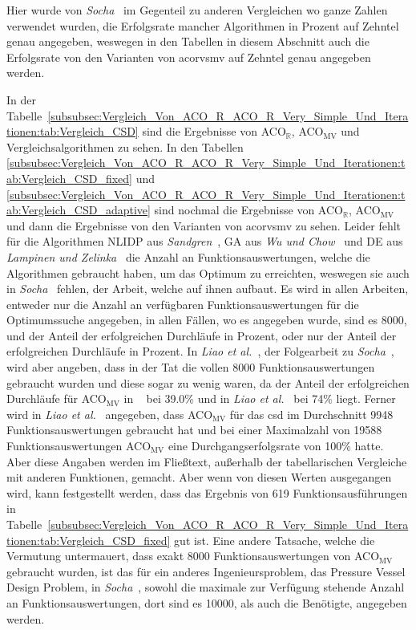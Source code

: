 \documentclass[fontsize=12, a4aper]{scrartcl}
\begin{document}
	Hier wurde von \textit{Socha}~\cite{socha2009ant} im Gegenteil zu anderen Vergleichen wo ganze Zahlen verwendet wurden, die Erfolgsrate mancher Algorithmen in Prozent auf Zehntel genau angegeben, weswegen in den Tabellen in diesem Abschnitt auch die Erfolgsrate von den Varianten von \ac{acorvsmv} auf Zehntel genau angegeben werden.\hfill\newline
	
	In der Tabelle~\ref{subsubsec:Vergleich_Von_ACO_R_ACO_R_Very_Simple_Und_Iterationen:tab:Vergleich_CSD} sind die Ergebnisse von ACO\(_\mathbb{R}\), ACO\(_\text{MV}\) und Vergleichsalgorithmen zu sehen. In den Tabellen \ref{subsubsec:Vergleich_Von_ACO_R_ACO_R_Very_Simple_Und_Iterationen:tab:Vergleich_CSD_fixed} und \ref{subsubsec:Vergleich_Von_ACO_R_ACO_R_Very_Simple_Und_Iterationen:tab:Vergleich_CSD_adaptive} sind nochmal die Ergebnisse von ACO\(_\mathbb{R}\), ACO\(_\text{MV}\) und dann die Ergebnisse von den Varianten von \ac{acorvsmv} zu sehen. Leider fehlt für die Algorithmen \glqq NLIDP\grqq{} aus \textit{Sandgren}~\cite{sandgren1990nonlinear}, \glqq GA\grqq{} aus \textit{Wu und Chow}~\cite{wu1995genetic} und \glqq DE\grqq{} aus \textit{Lampinen und Zelinka}~\cite{Lampinen_and_Zelinka_CSD} die Anzahl an Funktionsauswertungen, welche die Algorithmen gebraucht haben, um das Optimum zu erreichten, weswegen sie auch in \textit{Socha}~\cite{socha2009ant} fehlen, der Arbeit, welche auf ihnen aufbaut. Es wird in allen Arbeiten, entweder nur die Anzahl an verfügbaren Funktionsauswertungen für die Optimumssuche angegeben, in allen Fällen, wo es angegeben wurde, sind es 8000, und der Anteil der erfolgreichen Durchläufe in Prozent, oder nur der Anteil der erfolgreichen Durchläufe in Prozent. In \textit{Liao et al.}~\cite{ACO_2013}, der Folgearbeit zu \textit{Socha}~\cite{socha2009ant}, wird aber angeben, dass in der Tat die vollen 8000 Funktionsauswertungen gebraucht wurden und diese sogar zu wenig waren, da der Anteil der erfolgreichen Durchläufe für ACO\(_\text{MV}\) in ~\cite{socha2009ant} bei 39.0\% und in \textit{Liao et al.}~\cite{ACO_2013} bei 74\% liegt. Ferner wird in \textit{Liao et al.}~\cite{ACO_2013} angegeben, dass ACO\(_\text{MV}\) für das \ac{csd} im Durchschnitt 9948 Funktionsauswertungen gebraucht hat und bei einer Maximalzahl von 19588 Funktionsauswertungen ACO\(_\text{MV}\) eine Durchgangserfolgsrate von 100\% hatte. Aber diese Angaben werden im Fließtext, außerhalb der tabellarischen Vergleiche mit anderen Funktionen, gemacht. Aber wenn von diesen Werten ausgegangen wird, kann festgestellt werden, dass das Ergebnis von 619 Funktionsausführungen in Tabelle~\ref{subsubsec:Vergleich_Von_ACO_R_ACO_R_Very_Simple_Und_Iterationen:tab:Vergleich_CSD_fixed} gut ist. Eine andere Tatsache, welche die Vermutung untermauert, dass exakt 8000 Funktionsauswertungen von ACO\(_\text{MV}\) gebraucht wurden, ist das für ein anderes Ingenieursproblem, das Pressure Vessel Design Problem, in \textit{Socha}~\cite{socha2009ant}, sowohl die maximale zur Verfügung stehende Anzahl an Funktionsauswertungen, dort sind es 10000, als auch die Benötigte, angegeben werden.\hfill\newline
	
\end{document}
